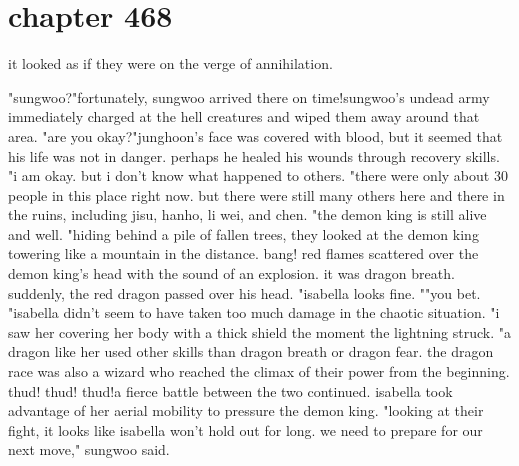 \section{chapter 468}

it looked as if they were on the verge of annihilation.
 




"sungwoo?"fortunately, sungwoo arrived there on time!sungwoo's undead army immediately charged at the hell creatures and wiped them away around that area.
"are you okay?"junghoon's face was covered with blood, but it seemed that his life was not in danger.
 perhaps he healed his wounds through recovery skills.
"i am okay.
 but i don't know what happened to others.
"there were only about 30 people in this place right now.
 but there were still many others here and there in the ruins, including jisu, hanho, li wei, and chen.
"the demon king is still alive and well.
"hiding behind a pile of fallen trees, they looked at the demon king towering like a mountain in the distance.
bang! red flames scattered over the demon king's head with the sound of an explosion.
 it was dragon breath.
 suddenly, the red dragon passed over his head.
"isabella looks fine.
""you bet.
"isabella didn't seem to have taken too much damage in the chaotic situation.
 "i saw her covering her body with a thick shield the moment the lightning struck.
"a dragon like her used other skills than dragon breath or dragon fear.
 the dragon race was also a wizard who reached the climax of their power from the beginning.
thud! thud! thud!a fierce battle between the two continued.
 isabella took advantage of her aerial mobility to pressure the demon king.
"looking at their fight, it looks like isabella won't hold out for long.
 we need to prepare for our next move," sungwoo said.
 
